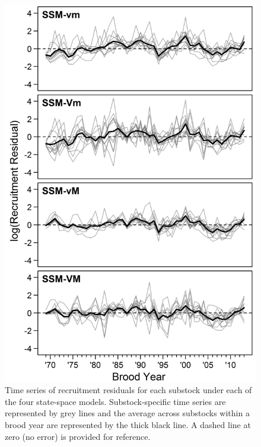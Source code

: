 \documentclass[12pt,]{book}
\theoremstyle{definition}
\theoremstyle{definition}
\theoremstyle{definition}
\theoremstyle{remark}
\begin{document}
\begin{figure}
  \centering
  \includegraphics{img/Ch4/log-resids.jpg}
  \caption{Time series of recruitment residuals for each substock under each of the four state-space models. Substock-specific time series are represented by grey lines and the average across substocks within a brood year are represented by the thick black line. A dashed line at zero (no error) is provided for reference.}
  \label{fig:log-resids}
\end{figure}

\clearpage
\end{document}
